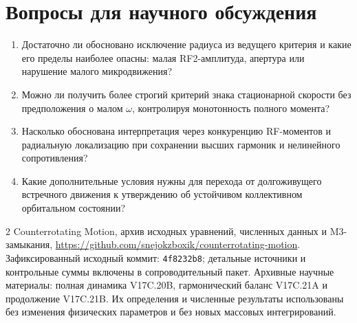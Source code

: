 \documentclass[aip,cha,reprint,a4paper,amsmath,amssymb]{revtex4-2}
\begin{document}
\section{Вопросы для научного обсуждения}
\begin{enumerate}
\item Достаточно ли обосновано исключение радиуса из ведущего критерия и какие его пределы наиболее опасны: малая RF2-амплитуда, апертура или нарушение малого микродвижения?
\item Можно ли получить более строгий критерий знака стационарной скорости без предположения о малом $\omega$, контролируя монотонность полного момента?
\item Насколько обоснована интерпретация через конкуренцию RF-моментов и радиальную локализацию при сохранении высших гармоник и нелинейного сопротивления?
\item Какие дополнительные условия нужны для перехода от долгоживущего встречного движения к утверждению об устойчивом коллективном орбитальном состоянии?
\end{enumerate}

\begin{thebibliography}{2}
 Counterrotating Motion, архив исходных уравнений, численных данных и M3-замыкания, \url{https://github.com/snejokzboxik/counterrotating-motion}. Зафиксированный исходный коммит: \texttt{4f8232b8}; детальные источники и контрольные суммы включены в сопроводительный пакет.
 Архивные научные материалы: полная динамика V17C.20B, гармонический баланс V17C.21A и продолжение V17C.21B. Их определения и численные результаты использованы без изменения физических параметров и без новых массовых интегрирований.
\end{thebibliography}
\end{document}
